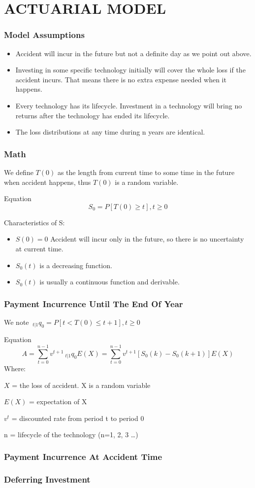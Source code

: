 \documentclass[slidestop,compress,mathserif,table]{beamer}
\begin{document}
\section{ACTUARIAL MODEL}

\begin{frame}
  \frametitle{Model Assumptions}
  \begin{itemize}
  \item Accident will incur in the future but not a definite day as we
    point out above.
    \item Investing in some specific technology initially will cover
      the whole loss if the accident incurs. That means there is no
      extra expense needed when it happens.
      \item Every technology has its lifecycle. Investment in a
        technology will bring no returns after the technology has
        ended its lifecycle.
        \item The loss distributions at any time during n years are identical.
  \end{itemize}
\end{frame}

\begin{frame}
  \frametitle{Math}
We define $T(0)$ as the length from current time to some time in the
future when accident happens, thus $T(0)$ is a random variable.
\begin{exampleblock}{Equation}
  \begin{equation}
    S_0=P[T(0)\ge t], t \ge 0
  \end{equation}
\end{exampleblock}
Characteristics of S:
\begin{itemize}
\item $S(0)=0$ Accident will incur only in the future, so there is no
  uncertainty at current time.
  \item $S_0(t)$ is a decreasing function.
    \item  $S_0(t)$ is usually a continuous function and derivable.
\end{itemize}
\end{frame}


\begin{frame}
  \frametitle{Payment Incurrence Until The End Of Year}
We note $ \ _{t|1}q_0=P[t<T(0) \le t+1], t \ge 0 $
  \begin{exampleblock}{Equation}
    \begin{equation}
      A=\sum_{t=0}^{n-1}v^{t+1} \ _{t|1}q_0E(X)=\sum_{t=0}^{n-1}v^{t+1}[S_0(k)-S_0(k+1)]E(X)
    \end{equation}
Where:

$X$ = the loss of accident. X is a random variable

$E(X)$ = expectation of X

$v^t$ = discounted rate from period t to period 0

n = lifecycle of the technology (n=1, 2, 3 \ldots)
  \end{exampleblock}
\end{frame}

\begin{frame}
  \frametitle{Payment Incurrence At Accident Time}
  
\end{frame}

\begin{frame}
  \frametitle{Deferring Investment}
  
\end{frame}
\end{document}

